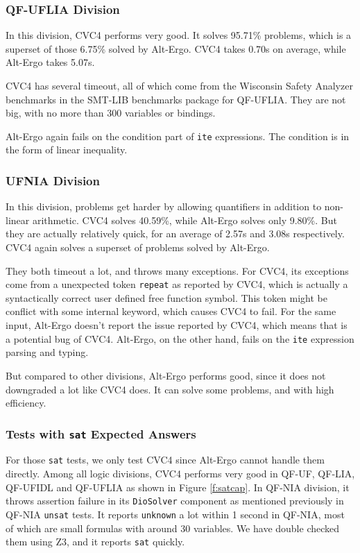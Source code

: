 \documentclass[10pt,letter]{article}
\theoremstyle{definition}
\begin{document}
\subsubsection{QF-UFLIA Division}

In this division, CVC4 performs very good. It solves 95.71\% problems, which is a superset of those 6.75\% solved by Alt-Ergo. CVC4 takes 0.70s on average, while Alt-Ergo takes 5.07s.

CVC4 has several timeout, all of which come from the Wisconsin Safety Analyzer benchmarks in the SMT-LIB benchmarks package for QF-UFLIA. They are not big, with no more than 300 variables or bindings.

Alt-Ergo again fails on the condition part of {\tt ite} expressions. The condition is in the form of linear inequality.

\subsubsection{UFNIA Division}

In this division, problems get harder by allowing quantifiers in addition to non-linear arithmetic. CVC4 solves 40.59\%, while Alt-Ergo solves only 9.80\%. But they are actually relatively quick, for an average of 2.57s and 3.08s respectively. CVC4 again solves a superset of problems solved by Alt-Ergo.

They both timeout a lot, and throws many exceptions. For CVC4, its exceptions come from a unexpected token {\tt repeat} as reported by CVC4, which is actually a syntactically correct user defined free function symbol. This token might be conflict with some internal keyword, which causes CVC4 to fail. For the same input, Alt-Ergo doesn't report the issue reported by CVC4, which means that is a potential bug of CVC4. Alt-Ergo, on the other hand, fails on the {\tt ite} expression parsing and typing.

But compared to other divisions, Alt-Ergo performs good, since it does not downgraded a lot like CVC4 does. It can solve some problems, and with high efficiency.



\subsubsection{Tests with {\tt sat} Expected Answers}

For those {\tt sat} tests, we only test CVC4 since Alt-Ergo cannot handle them directly. Among all logic divisions, CVC4 performs very good in QF-UF, QF-LIA, QF-UFIDL and QF-UFLIA as shown in Figure \ref{f:satcap}. In QF-NIA division, it throws assertion failure in its {\tt DioSolver} component as mentioned previously in QF-NIA {\tt unsat} tests. It reports {\tt unknown} a lot within 1 second in QF-NIA, most of which are small formulas with around 30 variables. We have double checked them using Z3, and it reports {\tt sat} quickly.
\end{document}
